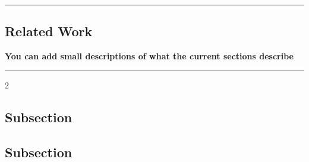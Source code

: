 {\color{gray}\hrule}
\begin{center}
\section{Related Work}
\textbf{You can add small descriptions of what the current sections describe}
\bigskip
\end{center}
{\color{gray}\hrule}
\begin{multicols}{2}
\subsection{Subsection}
\lipsum[1-3]
\subsection{Subsection}
\lipsum[1-2]
\end{multicols}